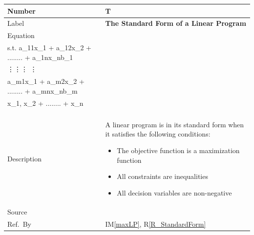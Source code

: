 \documentclass[12pt]{article}
\newcommand{\colAwidth}{0.13\textwidth}
\newcommand{\colBwidth}{0.82\textwidth}
\newcounter{theorynum} %
\newcommand{\iref}[1]{IM\ref{#1}}
\newcommand{\rref}[1]{R\ref{#1}}
\begin{document}
\noindent
\begin{minipage}{\textwidth}
	\renewcommand*{\arraystretch}{1.5}
	\begin{tabular}{| p{\colAwidth} | p{\colBwidth}|}
		\hline
		\rowcolor[gray]{0.9}
		Number& T{theorynum}\thetheorynum \label{T_LPSF}\\
	  	\hline
	  	Label&\bf The Standard Form of a Linear Program\\
	  	\hline
	  	Equation&\[
		  \left\{ \begin{array}{c}
		  max\;Z=\;\;\;c_{1}x_1 + c_{2}x_2 + ........ + c_{n}x_n \\ 
		  s.\;t.\;\;\;\; a_{11}x_1 + a_{12}x_2 + ........ + 
		  a_{1n}x_n\;{\leq}\;b_1 
		  \\
		  \hspace{1.3cm}\vdots \hspace{1.2cm}\vdots \hspace{2.6cm}\vdots 
		  \hspace{1.5cm}\vdots \\
		  \;\;\;\;\;\;\;\;\; a_{m1}x_1 + a_{m2}x_2 + ........ + 
		  a_{mn}x_n\;{\leq}\;b_m 
		  \\
		  x_1, x_2 + ........ + x_n\;{\geq}\;0 \\
		  \end{array}
		  \right. 
		  \]\\
	  	\hline
	  	Description & 
	      A linear program is in its standard form when it satisfies the 
	      following 
	      conditions: \newline
	      \begin{itemize}
	      	\item The objective function is a maximization function
	        
	        \item All constraints are inequalities
	        
	        \item All decision variables are non-negative
	      \end{itemize}\\
	  	\hline
	  	Source & \cite{lp-defs}\\
	  	\hline
	  	Ref.\ By & \iref{maxLP}, \rref{R_StandardForm}\\
	  	\hline
	\end{tabular}
\end{minipage}\\

~\newline
\end{document}

